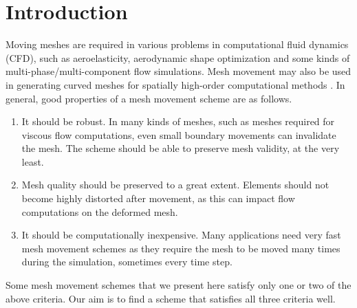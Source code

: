 \chapter{Introduction}

Moving meshes are required in various problems in computational fluid dynamics (CFD), such as aeroelasticity, aerodynamic shape optimization \cite{appl:opt} and some kinds of multi-phase/multi-component flow simulations. Mesh movement may also be used in generating curved meshes for spatially high-order computational methods \cite{curve:persson}. In general, good properties of a mesh movement scheme are as follows.
\begin{enumerate}
\item It should be robust. In many kinds of meshes, such as meshes required for viscous flow computations, even small boundary movements can invalidate the mesh. The scheme should be able to preserve mesh validity, at the very least.
\item Mesh quality should be preserved to a great extent. Elements should not become highly distorted after movement, as this can impact flow computations on the deformed mesh.
\item It should be computationally inexpensive. Many applications need very fast mesh movement schemes as they require the mesh to be moved many times during the simulation, sometimes every time step.
\end{enumerate}
Some mesh movement schemes that we present here satisfy only one or two of the above criteria. Our aim is to find a scheme that satisfies all three criteria well.
